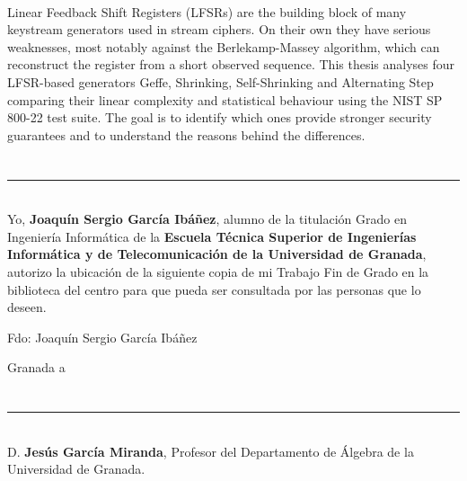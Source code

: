 \vspace{0.7cm}
\\

Linear Feedback Shift Registers (LFSRs) are the building block of many keystream generators used in stream ciphers.
On their own they have serious weaknesses, most notably against the Berlekamp-Massey algorithm, which can reconstruct the register from a short observed sequence.
This thesis analyses four LFSR-based generators Geffe, Shrinking, Self-Shrinking and Alternating Step comparing their linear complexity and statistical behaviour using the NIST
SP 800-22 test suite. The goal is to identify which ones provide stronger security guarantees and to understand the reasons behind the differences.

\chapter*{}
\thispagestyle{empty}

\noindent\rule[-1ex]{\textwidth}{2pt}\\[4.5ex]

Yo, \textbf{Joaquín Sergio García Ibáñez}, alumno de la titulación Grado en Ingeniería Informática de la \textbf{Escuela Técnica Superior de Ingenierías Informática y de
Telecomunicación de la Universidad de Granada}, autorizo la ubicación de la siguiente copia de mi Trabajo Fin de Grado en la biblioteca del centro para que pueda ser consultada por las
personas que lo deseen.

\vspace{6cm}

\noindent Fdo: Joaquín Sergio García Ibáñez

\vspace{2cm}

\begin{flushright}
Granada a \myTime
\end{flushright}

\chapter*{}
\thispagestyle{empty}

\noindent\rule[-1ex]{\textwidth}{2pt}\\[4.5ex]

D. \textbf{Jesús García Miranda}, Profesor del Departamento de Álgebra de la Universidad de Granada.

\vspace{0.5cm}

